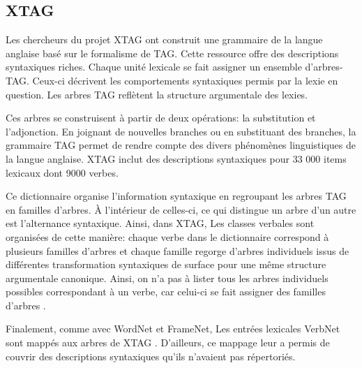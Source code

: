 

\subsection{XTAG}
Les chercheurs du projet XTAG \citep{ResearchGroupLexicalizedTreeAdjoining2001} ont construit une grammaire de la langue anglaise basé sur le formalisme de \acf{TAG}. Cette ressource offre des descriptions syntaxiques riches. Chaque unité lexicale se fait assigner un ensemble d'arbres-TAG. Ceux-ci décrivent les comportements syntaxiques permis par la lexie en question. Les arbres \ac{TAG} reflètent la structure argumentale des lexies.

Ces arbres se construisent à partir de deux opérations: la substitution et l'adjonction. En joignant de nouvelles branches ou en substituant des branches, la grammaire \ac{TAG} permet de rendre compte des divers phénomènes linguistiques de la langue anglaise. XTAG inclut des descriptions syntaxiques pour 33 000 items lexicaux dont 9000 verbes. 

Ce dictionnaire organise l'information syntaxique en regroupant les arbres \ac{TAG} en familles d'arbres. À l'intérieur de celles-ci, ce qui distingue un arbre d'un autre est l'alternance syntaxique. Ainsi, dans XTAG, Les classes verbales sont organisées de cette manière: chaque verbe dans le dictionnaire correspond à plusieurs familles d'arbres et chaque famille regorge d'arbres individuels issus de différentes transformation syntaxiques de surface pour une même structure argumentale canonique. Ainsi, on n'a pas à lister tous les arbres individuels possibles correspondant à un verbe, car celui-ci se fait assigner des familles d'arbres \citep{DoranXTAGSystemWide1994}.

Finalement, comme avec WordNet et FrameNet, Les entrées lexicales VerbNet sont mappés aux arbres de XTAG \citep{W04-3326}. D'ailleurs, ce mappage leur a permis de couvrir des descriptions syntaxiques qu'ils n'avaient pas répertoriés.


